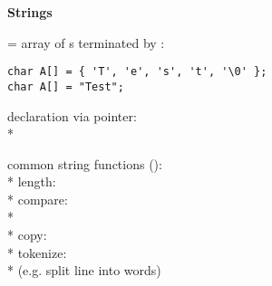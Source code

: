 \textbf{Strings}
\begin{items}
  \item = array of s terminated by :
  \begin{lstlisting}[style=customc]
char A[] = { 'T', 'e', 's', 't', '\0' };
char A[] = "Test";
  \end{lstlisting}
  \item declaration via pointer: \\*
  \item common string functions (): \\*
    length:  \\*
    compare: \\* \phantom{x}  \\*
    copy:  \\*
    tokenize:  \\* \phantom{x} (e.g. split line into words)
\end{items}
